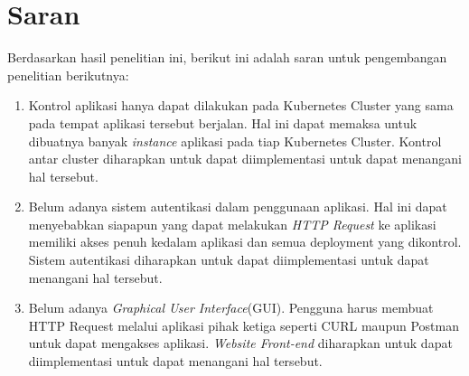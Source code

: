 \section{Saran}
\label{sec:saran}
Berdasarkan hasil penelitian ini, berikut ini adalah saran untuk pengembangan penelitian berikutnya:
\begin{enumerate}
	\item Kontrol aplikasi hanya dapat dilakukan pada Kubernetes Cluster yang sama pada tempat aplikasi tersebut berjalan. Hal ini dapat memaksa untuk dibuatnya banyak \textit{instance} aplikasi pada tiap Kubernetes Cluster. Kontrol antar cluster diharapkan untuk dapat diimplementasi untuk dapat menangani hal tersebut.
	\item Belum adanya sistem autentikasi dalam penggunaan aplikasi. Hal ini dapat menyebabkan siapapun yang dapat melakukan \textit{HTTP Request} ke aplikasi memiliki akses penuh kedalam aplikasi dan semua deployment yang dikontrol. Sistem autentikasi diharapkan untuk dapat diimplementasi untuk dapat menangani hal tersebut.
	\item Belum adanya \textit{Graphical User Interface}(GUI). Pengguna harus membuat HTTP Request melalui aplikasi pihak ketiga seperti CURL maupun Postman untuk dapat mengakses aplikasi. \textit{Website Front-end }diharapkan untuk dapat diimplementasi untuk dapat menangani hal tersebut.
\end{enumerate}
